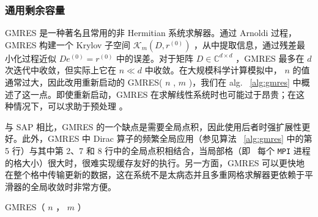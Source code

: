 \documentclass[5p,times,a4paper,fleqn]{cas-dc}
\begin{document}
   \subsubsection{通用剩余容量  }     

GMRES    \cite{saad1986}    是一种著名且常用的非 Hermitian 系统求解器。通过 Arnoldi 过程，GMRES 构建一个 Krylov 子空间    $\mathcal{K}_{m}(D,r^{(0)})$   ，从中提取信息，通过残差最小化过程近似    $D e^{(0)} = r^{(0)}$    中的误差。对于矩阵    $D \in \mathbb{C}^{d \times d}$    ，GMRES 最多在    $d$    次迭代中收敛，但实际上它在    $n \ll d$    中收敛。在大规模科学计算模拟中，   $n$    的值通常过大，因此改用重新启动的 GMRES(    $n$    ,    $m$    )，我们在 alg.~    \ref{alg:gmres}    中概述了这一点。即使重新启动，GMRES 在求解线性系统时也可能过于昂贵；在这种情况下，可以求助于预处理    \cite{saad2003iterative}   。  

与 SAP 相比，GMRES 的一个缺点是需要全局点积，因此使用后者时强扩展性更好。此外，GMRES 中 Dirac 算子的频繁全局应用（参见算法 \     \ref{alg:gmres}    中的第 5 行）与其中第 2、7 和 8 行中的全局点积相结合，当局部格（即 \  每个    \texttt{MPI}    进程的格大小）很大时，很难实现缓存友好的执行。另一方面，GMRES 可以更快地在整个格中传输更新的数据，这在系统不是太病态并且多重网格求解器更依赖于平滑器的全局收敛时非常方便。  

   \begin{algorithm}
\caption{GMRES（   $n$   ，   $m$   ）  } \label{alg:gmres}
\end{algorithm}     
\end{document}
